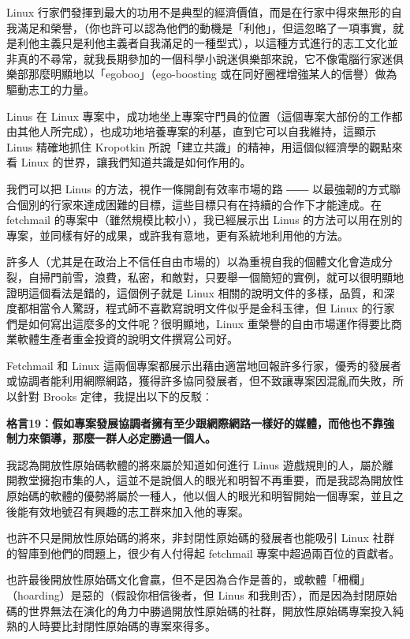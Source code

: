 \documentclass[12pt, a5paper]{book}
\begin{document}
Linux
行家們發揮到最大的功用不是典型的經濟價值，而是在行家中得來無形的自我滿足和榮譽，（你也許可以認為他們的動機是「利他」，但這忽略了一項事實，就是利他主義只是利他主義者自我滿足的一種型式），以這種方式進行的志工文化並非真的不尋常，就我長期參加的一個科學小說迷俱樂部來說，它不像電腦行家迷俱樂部那麼明顯地以「egoboo」（ego-boosting
或在同好圈裡增強某人的信譽）做為驅動志工的力量。

Linus 在 Linux
專案中，成功地坐上專案守門員的位置（這個專案大部份的工作都由其他人所完成），也成功地培養專案的利基，直到它可以自我維持，這顯示
Linus 精確地抓住 Kropotkin
所說「建立共識」的精神，用這個似經濟學的觀點來看 Linux
的世界，讓我們知道共識是如何作用的。

我們可以把 Linus 的方法，視作一條開創有效率市場的路 ――
以最強韌的方式聯合個別的行家來達成困難的目標，這些目標只有在持續的合作下才能達成。在
fetchmail 的專案中（雖然規模比較小），我已經展示出 Linus
的方法可以用在別的專案，並同樣有好的成果，或許我有意地，更有系統地利用他的方法。

許多人（尤其是在政治上不信任自由市場的）以為重視自我的個體文化會造成分裂，自掃門前雪，浪費，私密，和敵對，只要舉一個簡短的實例，就可以很明顯地證明這個看法是錯的，這個例子就是
Linux
相關的說明文件的多樣，品質，和深度都相當令人驚訝，程式師不喜歡寫說明文件似乎是金科玉律，但
Linux 的行家們是如何寫出這麼多的文件呢？很明顯地，Linux
重榮譽的自由市場運作得要比商業軟體生產者重金投資的說明文件撰寫公司好。

Fetchmail 和 Linux
這兩個專案都展示出藉由適當地回報許多行家，優秀的發展者或協調者能利用網際網路，獲得許多協同發展者，但不致讓專案因混亂而失敗，所以針對
Brooks 定律，我提出以下的反駁︰

\textbf{格言19︰假如專案發展協調者擁有至少跟網際網路一樣好的媒體，而他也不靠強制力來領導，那麼一群人必定勝過一個人。}

我認為開放性原始碼軟體的將來屬於知道如何進行 Linus
遊戲規則的人，屬於離開教堂擁抱市集的人，這並不是說個人的眼光和明智不再重要，而是我認為開放性原始碼的軟體的優勢將屬於一種人，他以個人的眼光和明智開始一個專案，並且之後能有效地號召有興趣的志工群來加入他的專案。

也許不只是開放性原始碼的將來，非封閉性原始碼的發展者也能吸引 Linux
社群的智庫到他們的問題上，很少有人付得起 fetchmail
專案中超過兩百位的貢獻者。

也許最後開放性原始碼文化會贏，但不是因為合作是善的，或軟體「柵欄」（hoarding）是惡的（假設你相信後者，但
Linus
和我則否），而是因為封閉原始碼的世界無法在演化的角力中勝過開放性原始碼的社群，開放性原始碼專案投入純熟的人時要比封閉性原始碼的專案來得多。
\end{document}
